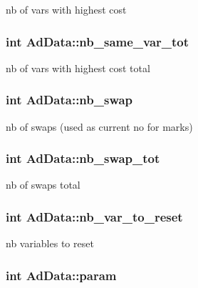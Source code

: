 nb of vars with highest cost \hypertarget{classAdData_a79a1aef4b701433f246d5cdc1edc1a0e}{
\subsubsection[{nb\-\_\-same\-\_\-var\-\_\-tot}]{\setlength{\rightskip}{0pt plus 5cm}int {\bf \-Ad\-Data\-::nb\-\_\-same\-\_\-var\-\_\-tot}}}\label{classAdData_a79a1aef4b701433f246d5cdc1edc1a0e}
nb of vars with highest cost total \hypertarget{classAdData_afb68c8b81015411d7cf17bf94328b139}{
\subsubsection[{nb\-\_\-swap}]{\setlength{\rightskip}{0pt plus 5cm}int {\bf \-Ad\-Data\-::nb\-\_\-swap}}}\label{classAdData_afb68c8b81015411d7cf17bf94328b139}
nb of swaps (used as current no for marks) \hypertarget{classAdData_a364283936f3917339829cbd86922699c}{
\subsubsection[{nb\-\_\-swap\-\_\-tot}]{\setlength{\rightskip}{0pt plus 5cm}int {\bf \-Ad\-Data\-::nb\-\_\-swap\-\_\-tot}}}\label{classAdData_a364283936f3917339829cbd86922699c}
nb of swaps total \hypertarget{classAdData_a060111a11c54ed717c9669a5baa61cdb}{
\subsubsection[{nb\-\_\-var\-\_\-to\-\_\-reset}]{\setlength{\rightskip}{0pt plus 5cm}int {\bf \-Ad\-Data\-::nb\-\_\-var\-\_\-to\-\_\-reset}}}\label{classAdData_a060111a11c54ed717c9669a5baa61cdb}
nb variables to reset \hypertarget{classAdData_a99e1f7b94c3bbcca45f638dd5eb92d1c}{
\subsubsection[{param}]{\setlength{\rightskip}{0pt plus 5cm}int {\bf \-Ad\-Data\-::param}}}\label{classAdData_a99e1f7b94c3bbcca45f638dd5eb92d1c}
